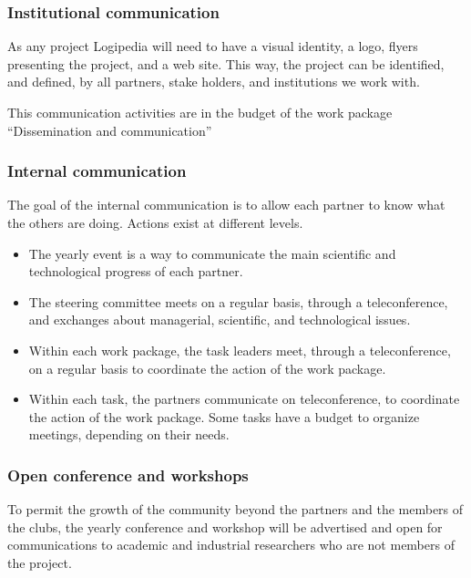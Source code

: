 \subsubsection*{Institutional communication}

As any project Logipedia will need to have a visual identity, a logo,
flyers presenting the project, and a web site. 
This way, the project can be identified, and defined, by all partners, 
stake holders, and institutions we work with. 

This communication activities are in the budget of the work package
``Dissemination and communication''

\subsubsection*{Internal communication}

The goal of the internal communication is to allow each partner to
know what the others are doing. Actions exist at different levels.

\begin{itemize}
\item The yearly event is a way to communicate the main scientific and
  technological progress of each partner.

\item The steering committee meets on a regular basis, through a
  teleconference, and exchanges about managerial, scientific, and
  technological issues.

\item Within each work package, the task leaders meet, through a
  teleconference, on a regular basis to coordinate the action of the
  work package.

\item Within each task, the partners communicate on teleconference, to
  coordinate the action of the work package. Some tasks have a budget
  to organize meetings, depending on their needs.
\end{itemize}

\subsubsection*{Open conference and workshops}

To permit the growth of the community beyond the partners and the
members of the clubs, the yearly conference and workshop will be
advertised and open for communications to academic and industrial
researchers who are not members of the project.

